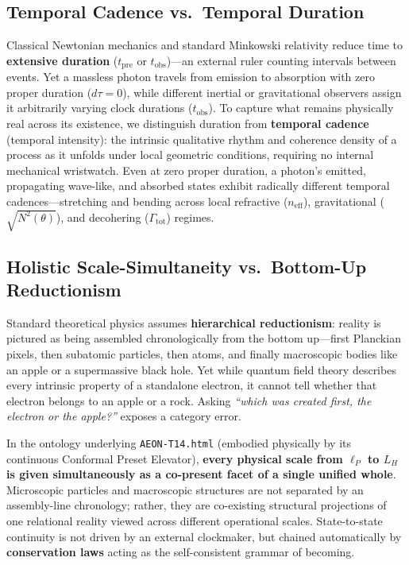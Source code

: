 \documentclass[11pt,a4paper]{article}
\begin{document}
\subsection{Temporal Cadence vs.\ Temporal Duration}
Classical Newtonian mechanics and standard Minkowski relativity reduce time to \textbf{extensive duration} ($t_{\mathrm{pre}}$ or $t_{\mathrm{obs}}$)---an external ruler counting intervals between events. Yet a massless photon travels from emission to absorption with zero proper duration ($d\tau = 0$), while different inertial or gravitational observers assign it arbitrarily varying clock durations ($t_{\mathrm{obs}}$). To capture what remains physically real across its existence, we distinguish duration from \textbf{temporal cadence} (temporal intensity): the intrinsic qualitative rhythm and coherence density of a process as it unfolds under local geometric conditions, requiring no internal mechanical wristwatch. Even at zero proper duration, a photon's emitted, propagating wave-like, and absorbed states exhibit radically different temporal cadences---stretching and bending across local refractive ($n_{\mathrm{eff}}$), gravitational ($\sqrt{N^2(\theta)}$), and decohering ($\Gamma_{\mathrm{tot}}$) regimes.

\subsection{Holistic Scale-Simultaneity vs.\ Bottom-Up Reductionism}
Standard theoretical physics assumes \textbf{hierarchical reductionism}: reality is pictured as being assembled chronologically from the bottom up---first Planckian pixels, then subatomic particles, then atoms, and finally macroscopic bodies like an apple or a supermassive black hole. Yet while quantum field theory describes every intrinsic property of a standalone electron, it cannot tell whether that electron belongs to an apple or a rock. Asking \emph{``which was created first, the electron or the apple?''} exposes a category error.

In the ontology underlying \texttt{AEON-T14.html} (embodied physically by its continuous Conformal Preset Elevator), \textbf{every physical scale from $\ell_P$ to $L_H$ is given simultaneously as a co-present facet of a single unified whole}. Microscopic particles and macroscopic structures are not separated by an assembly-line chronology; rather, they are co-existing structural projections of one relational reality viewed across different operational scales. State-to-state continuity is not driven by an external clockmaker, but chained automatically by \textbf{conservation laws} acting as the self-consistent grammar of becoming.
\end{document}
